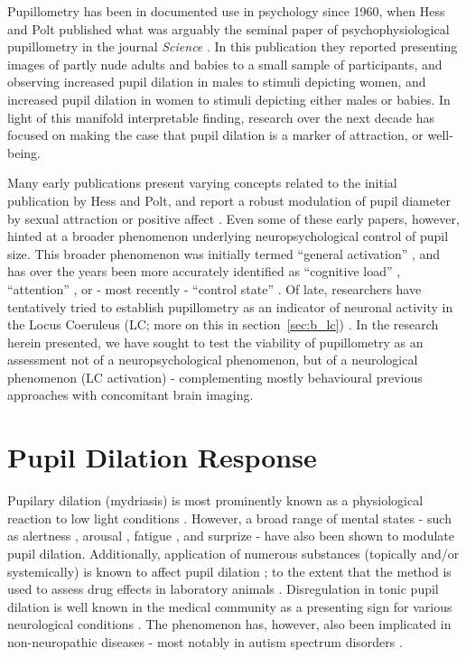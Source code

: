 	Pupillometry has been in documented use in psychology since 1960, when Hess and Polt published what was arguably the seminal paper of psychophysiological pupillometry in the journal \textit{Science} \citep{HESS1960}.
	In this publication they reported presenting images of partly nude adults and babies to a small sample of participants, and observing increased pupil dilation in males to stimuli depicting women, and increased pupil dilation in women to stimuli depicting either males or babies.
	In light of this manifold interpretable finding, research over the next decade has focused on making the case that pupil dilation is a marker of attraction, or well-being.
	
	Many early publications present varying concepts related to the initial publication by Hess and Polt, and report a robust modulation of pupil diameter by sexual attraction \citep{Goldwater1972, HESS1965} or positive affect \citep{Nunally1967, Bradshaw1967}.
	Even some of these early papers, however, hinted at a broader phenomenon underlying neuropsychological control of pupil size.
	This broader phenomenon was initially termed “general activation” \citep{Nunally1967}, and has over the years been more accurately identified as “cognitive load” \citep{Laeng2011,Zekveld2011}, “attention” \citep{Wykowska2013,Kraemer2000}, or - most recently - “control state” \citep{Hayes2013}.
	Of late, researchers have tentatively tried to establish pupillometry as an indicator of neuronal activity in the Locus Coeruleus (LC; more on this in section~\ref{sec:b_lc}) \citep{Gilzenrat2010}.
	In the research herein presented, we have sought to test the viability of pupillometry as an assessment not of a neuropsychological phenomenon, but of a neurological phenomenon (LC activation) - 
	complementing mostly behavioural previous approaches \citep{Gilzenrat2010,Granholm2004} with concomitant brain imaging.
	
    \section{Pupil Dilation Response}\label{sec:b_pdr}
	Pupilary dilation (mydriasis) is most prominently known as a physiological reaction to low light conditions \citep{Ellis1981}. 
	However, a broad range of mental states - 
	such as alertness \citep{Yoss1970}, arousal \citep{Bradshaw1967}, fatigue \citep{Morad2000}, and surprize \citep{Preuschoff2011} -
	have also been shown to modulate pupil dilation.
	Additionally, application of numerous substances (topically and/or systemically) is known to affect pupil dilation \citep{Theofilopoulos1988, Bye1979, Phillips2000}; to the extent that the method is used to assess drug effects in laboratory animals \citep{Murray1981}.
	Disregulation in tonic pupil dilation is well known in the medical community as a presenting sign for various neurological conditions \citep{Caglayan2013}.
	The phenomenon has, however, also been implicated in non-neuropathic diseases - most notably in autism spectrum disorders \citep{Anderson2013}.
	
